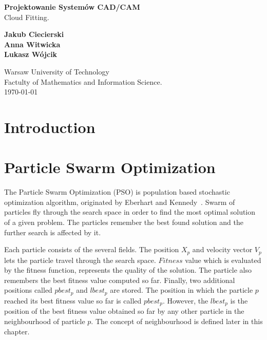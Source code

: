 \documentclass{book}
\author{Jakub Ciecierski}
\date{\today}
\begin{document}
\begin{titlepage}
    \begin{center}

            \textbf{\Huge Projektowanie Systemów CAD/CAM} \\ {\huge Cloud Fitting.} \\ [0.5cm]

            \vspace*{\fill}

            \textbf{\large Jakub Ciecierski \\ Anna Witwicka \\ Lukasz Wójcik}

            \vspace*{\fill}
            
            \textnormal{\large Warsaw University of Technology \\ Factulty of Mathematics and Information Science. \\ \today}

    \end{center}
\end{titlepage}

\tableofcontents


\chapter*{Introduction}


\chapter{Particle Swarm Optimization}\label{chap:pso}

The Particle Swarm Optimization (PSO) is population based stochastic optimization algorithm, originated by Eberhart and Kennedy~\cite{pso_origin}. Swarm of particles fly through the search space in order to find the most optimal solution of a given problem. The particles remember the best found solution and the further search is affected by it.

Each particle consists of the several fields. The position $X_p$ and velocity vector $V_p$ lets the particle travel through the search space. $Fitness$ value which is evaluated by the fitness function, represents the quality of the solution. The particle also remembers the best fitness value computed so far. Finally, two additional positions called $pbest_p$ and $lbest_p$ are stored. The position in which the particle $p$ reached its best fitness value so far is called $pbest_p$. However, the $lbest_p$ is the position of the best fitness value obtained so far by any other particle in the neighbourhood of particle $p$. The concept of neighbourhood is defined later in this chapter.
\end{document}
